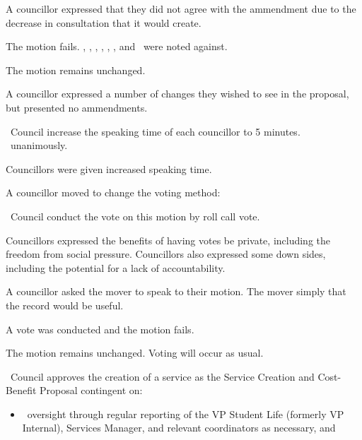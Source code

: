 \begin{motion}
\begin{motion}
        A councillor expressed that they did not agree with the ammendment due
        to the decrease in consultation that it would create.

        The motion fails. \katie, \jennifer, \seneca, \nickta, \rebecca, \cai,
        and \stephanie\ were noted against.

    \end{motion}

    The motion remains unchanged.

    A councillor expressed a number of changes they wished to see in the
    proposal, but presented no ammendments.

    \begin{motion}
        \birt\ Council increase the speaking time of each councillor to 5
        minutes.
        \movers{\seneca}{\cai}
        \carries\ unanimously.
    \end{motion}

    Councillors were given increased speaking time.

    A councillor moved to change the voting method:

    \begin{motion}
        \birt\ Council conduct the vote on this motion by roll call vote.
        \movers{\harsh}{\nickta}

        Councillors expressed the benefits of having votes be private,
        including the freedom from social pressure. Councillors also expressed
        some down sides, including the potential for a lack of accountability.

        A councillor asked the mover to speak to their motion. The mover simply
        that the record would be useful.

        A vote was conducted and the motion fails.
    \end{motion}

    The motion remains unchanged. Voting will occur as usual.

    \begin{motion}
        \birt\ Council approves the creation of a service as the Service Creation
        and Cost-Benefit Proposal contingent on:

        \begin{itemize}
            \item \clac\ oversight through regular reporting of the VP Student
                Life (formerly VP Internal), Services Manager, and relevant
                coordinators as necessary, and 


\end{itemize}
\end{motion}
\end{motion}
